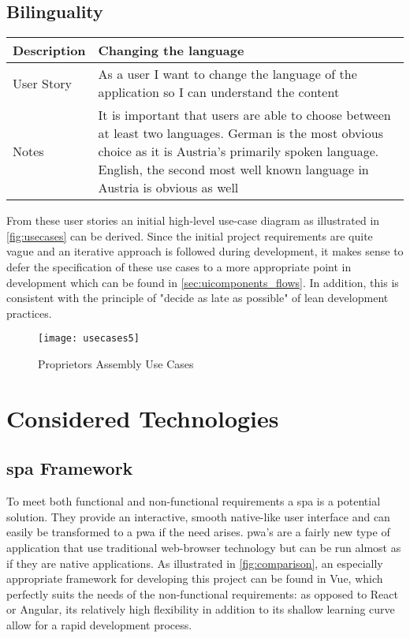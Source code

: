 \subsection{Bilinguality}
\begin{table}[H]
  \begin{tabularx}{\linewidth}{l|X}
     Description & Changing the language \\
     \hline
     User Story & As a user I want to change the language of the application so I can understand the content \\
     \hline
     Notes & It is important that users are able to choose between at least two languages. German is the most obvious choice as it is Austria's primarily spoken language. English, the second most well known language in Austria is obvious as well 
  \end{tabularx}
\end{table}

From these user stories an initial high-level use-case diagram as illustrated in \autoref{fig:usecases} can be derived. Since the initial project requirements are quite vague and an iterative approach is followed during development, it makes sense to defer the specification of these use cases to a more appropriate point in development which can be found in \autoref{sec:uicomponents_flows}. In addition, this is consistent with the principle of "decide as late as possible" of lean development practices.

\begin{figure}[H]
    \begin{center}
    \texttt{[image: usecases5]}
    \end{center}
    \caption{Proprietors Assembly Use Cases}
    \label{fig:usecases}
\end{figure}

\section{Considered Technologies} \label{sec:consideredtech}
\subsection{\acrshort{spa} Framework}
To meet both functional and non-functional requirements a \acrfull{spa} is a potential solution. They provide an interactive, smooth native-like user interface and can easily be transformed to a \acrfull{pwa} if the need arises. \acrshort{pwa}'s are a fairly new type of application that use traditional web-browser technology but can be run almost as if they are native applications. As illustrated in \autoref{fig:comparison}, an especially appropriate framework for developing this project can be found in Vue, which perfectly suits the needs of the non-functional requirements: as opposed to React or Angular, its relatively high flexibility in addition to its shallow learning curve allow for a rapid development process.

